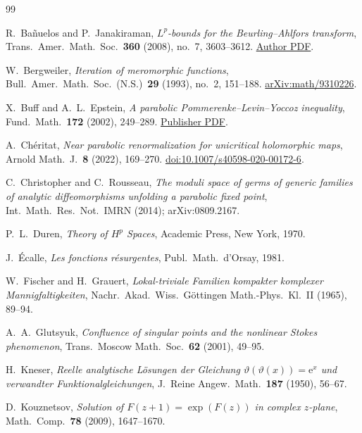 \documentclass[11pt,a4paper]{article}
\theoremstyle{definition}
\newcommand{\eee}{\mathrm{e}}
\begin{document}
\begin{thebibliography}{99}

R.~Ba\~nuelos and P.~Janakiraman,
\emph{$L^p$-bounds for the Beurling--Ahlfors transform},
Trans.\ Amer.\ Math.\ Soc.\ \textbf{360} (2008), no.~7, 3603--3612.
\href{https://www.math.purdue.edu/~banuelos/Papers/Beur_Ahl.pdf}{Author PDF}.

W.~Bergweiler,
\emph{Iteration of meromorphic functions},
Bull.\ Amer.\ Math.\ Soc.\ (N.S.)\ \textbf{29} (1993), no.~2, 151--188.
\href{https://arxiv.org/abs/math/9310226}{arXiv:math/9310226}.

X.~Buff and A.~L.~Epstein,
\emph{A parabolic Pommerenke--Levin--Yoccoz inequality},
Fund.\ Math.\ \textbf{172} (2002), 249--289.
\href{https://www.impan.pl/shop/en/publication/transaction/download/product/89261}{Publisher PDF}.

A.~Ch\'eritat,
\emph{Near parabolic renormalization for unicritical holomorphic maps},
Arnold Math.\ J.\ \textbf{8} (2022), 169--270.
\href{https://doi.org/10.1007/s40598-020-00172-6}{doi:10.1007/s40598-020-00172-6}.

C.~Christopher and C.~Rousseau,
\emph{The moduli space of germs of generic families of analytic
diffeomorphisms unfolding a parabolic fixed point},
Int.\ Math.\ Res.\ Not.\ IMRN (2014); arXiv:0809.2167.

P.~L.~Duren, \emph{Theory of $H^p$ Spaces}, Academic Press, New York, 1970.

J.~\'Ecalle,
\emph{Les fonctions r\'esurgentes}, Publ.\ Math.\ d'Orsay, 1981.

W.~Fischer and H.~Grauert,
\emph{Lokal-triviale Familien kompakter komplexer Mannigfaltigkeiten},
Nachr.\ Akad.\ Wiss.\ G\"ottingen Math.-Phys.\ Kl.\ II (1965), 89--94.

A.~A.~Glutsyuk,
\emph{Confluence of singular points and the nonlinear Stokes phenomenon},
Trans.\ Moscow Math.\ Soc.\ \textbf{62} (2001), 49--95.

H.~Kneser,
\emph{Reelle analytische L\"osungen der Gleichung
$\vartheta(\vartheta(x))=\eee^{x}$ und verwandter Funktionalgleichungen},
J.\ Reine Angew.\ Math.\ \textbf{187} (1950), 56--67.

D.~Kouznetsov,
\emph{Solution of $F(z+1)=\exp(F(z))$ in complex $z$-plane},
Math.\ Comp.\ \textbf{78} (2009), 1647--1670.


\end{thebibliography}
\end{document}
